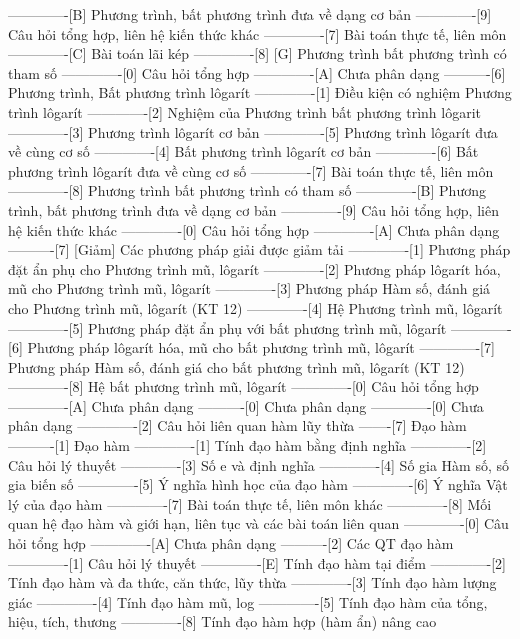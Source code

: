 -------------[B] Phương trình, bất phương trình đưa về dạng cơ bản
-------------[9] Câu hỏi tổng hợp, liên hệ kiến thức khác
-------------[7] Bài toán thực tế, liên môn
-------------[C] Bài toán lãi kép
-------------[8] [G] Phương trình bất phương trình có tham số
-------------[0] Câu hỏi tổng hợp
-------------[A] Chưa phân dạng
----------[6] Phương trình, Bất phương trình lôgarít
-------------[1] Điều kiện có nghiệm Phương trình lôgarít
-------------[2] Nghiệm của Phương trình bất phương trình lôgarit
-------------[3] Phương trình lôgarít cơ bản
-------------[5] Phương trình lôgarít đưa về cùng cơ số
-------------[4] Bất phương trình lôgarít cơ bản
-------------[6] Bất phương trình lôgarít đưa về cùng cơ số
-------------[7] Bài toán thực tế, liên môn
-------------[8] Phương trình bất phương trình có tham số
-------------[B] Phương trình, bất phương trình đưa về dạng cơ bản
-------------[9] Câu hỏi tổng hợp, liên hệ kiến thức khác
-------------[0] Câu hỏi tổng hợp 
-------------[A] Chưa phân dạng
----------[7] [Giảm] Các phương pháp giải được giảm tải
-------------[1] Phương pháp đặt ẩn phụ cho Phương trình mũ, lôgarít
-------------[2] Phương pháp lôgarít hóa, mũ cho Phương trình mũ, lôgarít
-------------[3] Phương pháp Hàm số, đánh giá cho Phương trình mũ, lôgarít (KT 12)
-------------[4] Hệ Phương trình mũ, lôgarít
-------------[5] Phương pháp đặt ẩn phụ với bất phương trình mũ, lôgarít
-------------[6] Phương pháp lôgarít hóa, mũ cho bất phương trình mũ, lôgarít
-------------[7] Phương pháp Hàm số, đánh giá cho bất phương trình mũ, lôgarít (KT 12)
-------------[8] Hệ bất phương trình mũ, lôgarít
-------------[0] Câu hỏi tổng hợp
-------------[A] Chưa phân dạng
----------[0] Chưa phân dạng
-------------[0] Chưa phân dạng
-------------[2] Câu hỏi liên quan hàm lũy thừa
-------[7] Đạo hàm
----------[1] Đạo hàm
-------------[1] Tính đạo hàm bằng định nghĩa
-------------[2] Câu hỏi lý thuyết
-------------[3] Số e và định nghĩa
-------------[4] Số gia Hàm số, số gia biến số
-------------[5] Ý nghĩa hình học của đạo hàm
-------------[6] Ý nghĩa Vật lý của đạo hàm
-------------[7] Bài toán thực tế, liên môn khác
-------------[8] Mối quan hệ đạo hàm và giới hạn, liên tục và các bài toán liên quan
-------------[0] Câu hỏi tổng hợp
-------------[A] Chưa phân dạng
----------[2] Các QT đạo hàm
-------------[1] Câu hỏi lý thuyết
-------------[E] Tính đạo hàm tại điểm
-------------[2] Tính đạo hàm và đa thức, căn thức, lũy thừa 
-------------[3] Tính đạo hàm lượng giác
-------------[4] Tính đạo hàm mũ, log
-------------[5] Tính đạo hàm của tổng, hiệu, tích, thương
-------------[8] Tính đạo hàm hợp (hàm ẩn) nâng cao

